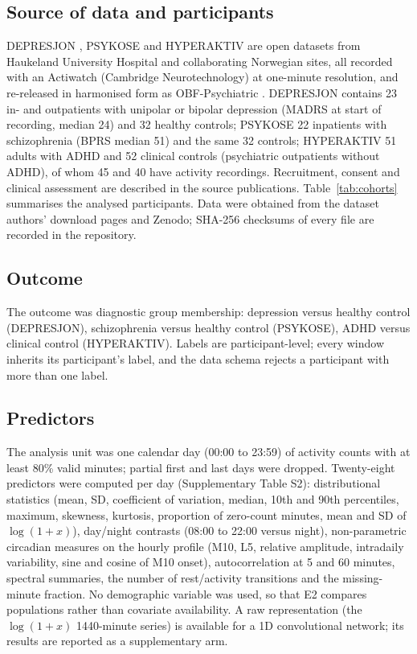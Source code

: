 \documentclass[11pt,a4paper]{article}
\begin{document}
\subsection{Source of data and participants}
DEPRESJON \cite{garciaceja2018}, PSYKOSE \cite{jakobsen2020} and HYPERAKTIV \cite{hicks2021} are
open datasets from Haukeland University Hospital and collaborating Norwegian sites, all recorded
with an Actiwatch (Cambridge Neurotechnology) at one-minute resolution, and re-released in
harmonised form as OBF-Psychiatric \cite{obf2025}. DEPRESJON contains 23 in- and outpatients with
unipolar or bipolar depression (MADRS at start of recording, median 24) and 32 healthy controls;
PSYKOSE 22 inpatients with schizophrenia (BPRS median 51) and the same 32 controls; HYPERAKTIV 51
adults with ADHD and 52 clinical controls (psychiatric outpatients without ADHD), of whom 45 and
40 have activity recordings. Recruitment, consent and clinical assessment are described in the
source publications. Table~\ref{tab:cohorts} summarises the analysed participants. Data were
obtained from the dataset authors' download pages and Zenodo; SHA-256 checksums of every file are
recorded in the repository.

\subsection{Outcome}
The outcome was diagnostic group membership: depression versus healthy control (DEPRESJON),
schizophrenia versus healthy control (PSYKOSE), ADHD versus clinical control (HYPERAKTIV). Labels
are participant-level; every window inherits its participant's label, and the data schema rejects a
participant with more than one label.

\subsection{Predictors}
The analysis unit was one calendar day (00:00 to 23:59) of activity counts with at least 80\%
valid minutes; partial first and last days were dropped. Twenty-eight predictors were computed per
day (Supplementary Table S2): distributional statistics (mean, SD, coefficient of variation,
median, 10th and 90th percentiles, maximum, skewness, kurtosis, proportion of zero-count minutes,
mean and SD of $\log(1+x)$), day/night contrasts (08:00 to 22:00 versus night), non-parametric
circadian measures on the hourly profile (M10, L5, relative amplitude, intradaily variability,
sine and cosine of M10 onset), autocorrelation at 5 and 60 minutes, spectral summaries, the
number of rest/activity transitions and the missing-minute fraction. No demographic variable was
used, so that E2 compares populations rather than covariate availability. A raw representation
(the $\log(1+x)$ 1440-minute series) is available for a 1D convolutional network; its results are
reported as a supplementary arm.
\end{document}
